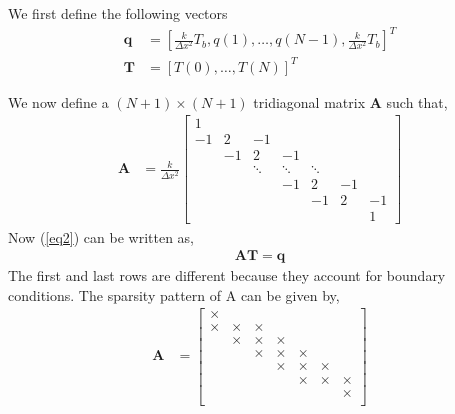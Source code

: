 \documentclass[12 pt, final]{article}
\renewcommand{\d}{\times}
\begin{document}
\begin{itemize}
\begin{itemize}
\begin{enumerate}
                We first define the following vectors
                \begin{align*}
                    \mathbf{q} &= \left[\frac{k}{\Delta x^2} T_b ,q(1) ,\hdots, q(N-1),\frac{k}{\Delta x^2} T_b \right]^T\\
                    \mathbf{T} &= [T(0) ,\hdots, T(N)]^T
                \end{align*}
            
                We now define a $(N+1)\times(N+1)$ tridiagonal matrix $\mathbf{A}$ such that,
                \begin{align*}
                    \mathbf{A} &= \frac{k}{\Delta x^2}\begin{bmatrix} 
                    1 \\
                    -1 & 2 & -1  \\
                    & -1 & 2 & -1  \\
                    && \ddots & \ddots & \ddots\\
                    &&& -1 & 2 & -1\\
                    &&&& -1 & 2 & -1\\
                    &&&&&& 1
                    \end{bmatrix}
                \end{align*}
                Now (\ref{eq2}) can be written as,
                \begin{align*}
                    \mathbf{AT} = \mathbf{q}
                \end{align*}
                The first and last rows are different because they account for boundary conditions.
                The sparsity pattern of A can be given by,
                \begin{align*}
                    \mathbf{A} &= \begin{bmatrix} 
                    \d \\
                    \d & \d & \d  \\
                    & \d & \d & \d  \\
                    && \d & \d & \d\\
                    &&& \d & \d & \d\\
                    &&&& \d & \d & \d\\
                    &&&&&& \d\\
                    \end{bmatrix}
                \end{align*} 
                

\end{enumerate}
\end{itemize}
\end{itemize}
\end{document}
